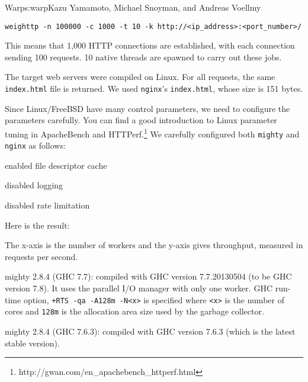 \begin{aosachapter}{Warp}{s:warp}{Kazu Yamamoto, Michael Snoyman, and Andreas Voellmy}
\begin{verbatim}
weighttp -n 100000 -c 1000 -t 10 -k http://<ip_address>:<port_number>/
\end{verbatim}

This means that 1,000 HTTP connections are established, with each
connection sending 100 requests. 10 native threads are spawned to carry
out these jobs.

The target web servers were compiled on Linux. For all requests, the
same \texttt{index.html} file is returned. We used \texttt{nginx}'s
\texttt{index.html}, whose size is 151 bytes.

Since Linux/FreeBSD have many control parameters, we need to configure
the parameters carefully. You can find a good introduction to Linux
parameter tuning in ApacheBench and
HTTPerf.\footnote{http://gwan.com/en\_apachebench\_httperf.html} We
carefully configured both \texttt{mighty} and \texttt{nginx} as follows:

\begin{aosaitemize}

\item
  enabled file descriptor cache
\item
  disabled logging
\item
  disabled rate limitation
\end{aosaitemize}

\noindent Here is the result:


The x-axis is the number of workers and the y-axis gives throughput,
measured in requests per second.

\begin{aosaitemize}

\item
  mighty 2.8.4 (GHC 7.7): compiled with GHC version 7.7.20130504 (to be
  GHC version 7.8). It uses the parallel I/O manager with only one
  worker. GHC run-time option,
  \texttt{+RTS -qa -A128m -N\textless{}x\textgreater{}} is specified
  where \texttt{\textless{}x\textgreater{}} is the number of cores and
  \texttt{128m} is the allocation area size used by the garbage
  collector.
\item
  mighty 2.8.4 (GHC 7.6.3): compiled with GHC version 7.6.3 (which is
  the latest stable version).
\end{aosaitemize}



\end{aosachapter}
